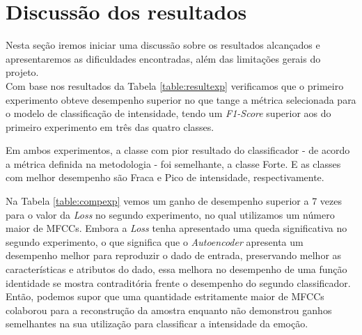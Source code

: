


\clearpage

\section{Discussão dos resultados}

Nesta seção iremos iniciar uma discussão sobre os resultados alcançados e apresentaremos as dificuldades encontradas, além das limitações gerais do projeto.\\

Com base nos resultados da Tabela \ref{table:resultexp} verificamos que o primeiro experimento obteve desempenho superior no que tange a métrica selecionada para o modelo de classificação de intensidade, tendo um \textit{F1-Score} superior aos do primeiro experimento em três das quatro classes.

Em ambos experimentos, a classe com pior resultado do classificador - de acordo a métrica definida na metodologia - foi semelhante, a classe Forte. E as classes com melhor desempenho são Fraca e Pico de intensidade, respectivamente.

Na Tabela \ref{table:compexp} vemos um ganho de desempenho superior a 7 vezes para o valor da \textit{Loss} no segundo experimento, no qual utilizamos um número maior de \acrshort{MFCC}s. Embora a \textit{Loss} tenha apresentado uma queda significativa no segundo experimento, o que significa que o \textit{Autoencoder} apresenta um desempenho melhor para reproduzir o dado de entrada, preservando melhor as características e atributos do dado, essa melhora no desempenho de uma função identidade se mostra contraditória frente o desempenho do segundo classificador. Então, podemos supor que uma quantidade estritamente maior de \acrshort{MFCC}s colaborou para a reconstrução da amostra enquanto não demonstrou ganhos semelhantes na sua utilização para classificar a intensidade da emoção.


